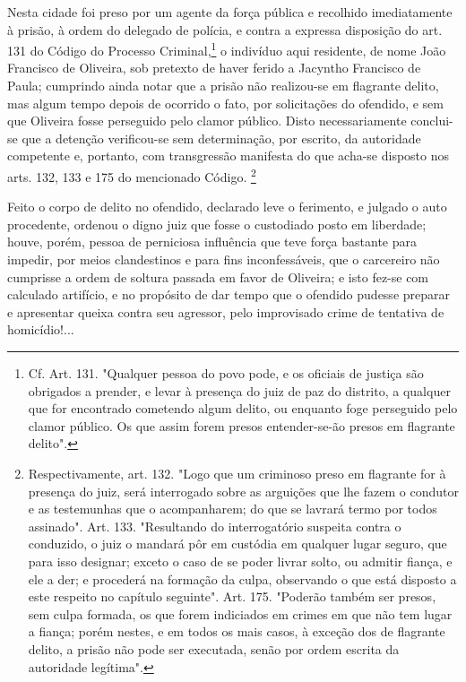 Nesta cidade foi preso por um agente da força pública e recolhido
imediatamente à prisão, à ordem do delegado de polícia, e contra a
expressa disposição do art. 131 do Código do Processo
Criminal,\footnote{Cf. Art. 131. "Qualquer pessoa do povo pode, e os
  oficiais de justiça são obrigados a prender, e levar à presença do
  juiz de paz do distrito, a qualquer que for encontrado cometendo algum
  delito, ou enquanto foge perseguido pelo clamor público. Os que assim
  forem presos entender-se-ão presos em flagrante delito".} o indivíduo
aqui residente, de nome João Francisco de Oliveira, sob pretexto de
haver ferido a Jacyntho Francisco de Paula; cumprindo ainda notar que a
prisão não realizou-se em flagrante delito, mas algum tempo depois de
ocorrido o fato, por solicitações do ofendido, e sem que Oliveira fosse
perseguido pelo clamor público. Disto necessariamente conclui-se que a
detenção verificou-se sem determinação, por escrito, da autoridade
competente e, portanto, com transgressão manifesta do que acha-se
disposto nos arts. 132, 133 e 175 do mencionado Código. \footnote{Respectivamente, art. 132. "Logo que um criminoso preso em flagrante
  for à presença do juiz, será interrogado sobre as arguições que lhe
  fazem o condutor e as testemunhas que o acompanharem; do que se
  lavrará termo por todos assinado". Art. 133. "Resultando do
  interrogatório suspeita contra o conduzido, o juiz o mandará pôr em
  custódia em qualquer lugar seguro, que para isso designar; exceto o
  caso de se poder livrar solto, ou admitir fiança, e ele a der; e
  procederá na formação da culpa, observando o que está disposto a este
  respeito no capítulo seguinte". Art. 175. "Poderão também ser presos,
  sem culpa formada, os que forem indiciados em crimes em que não tem
  lugar a fiança; porém nestes, e em todos os mais casos, à exceção dos
  de flagrante delito, a prisão não pode ser executada, senão por ordem
  escrita da autoridade legítima".}

Feito o corpo de delito no ofendido, declarado leve o ferimento, e
julgado o auto procedente, ordenou o digno juiz que fosse o custodiado
posto em liberdade; houve, porém, pessoa de perniciosa influência que
teve força bastante para impedir, por meios clandestinos e para fins
inconfessáveis, que o carcereiro não cumprisse a ordem de soltura
passada em favor de Oliveira; e isto fez-se com calculado artifício, e
no propósito de dar tempo que o ofendido pudesse preparar e apresentar
queixa contra seu agressor, pelo improvisado crime de tentativa de
homicídio!...

